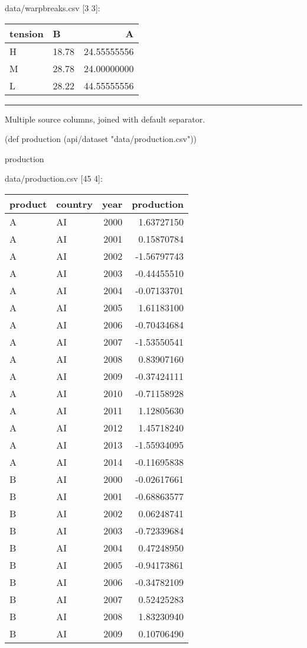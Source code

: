 \documentclass[]{article}
\newenvironment{Shaded}{\begin{snugshade}}{\end{snugshade}}
\newcommand{\StringTok}[1]{\textcolor[rgb]{0.31,0.60,0.02}{#1}}
\newcommand{\FunctionTok}[1]{\textcolor[rgb]{0.00,0.00,0.00}{#1}}
\newcommand{\BuiltInTok}[1]{#1}
\newcommand{\NormalTok}[1]{#1}
\begin{document}
data/warpbreaks.csv {[}3 3{]}:

\begin{longtable}[]{@{}llr@{}}
\toprule
tension & B & A\tabularnewline
\midrule
\endhead
H & 18.78 & 24.55555556\tabularnewline
M & 28.78 & 24.00000000\tabularnewline
L & 28.22 & 44.55555556\tabularnewline
\bottomrule
\end{longtable}

\begin{center}\rule{0.5\linewidth}{0.5pt}\end{center}

Multiple source columns, joined with default separator.

\begin{Shaded}
\begin{Highlighting}[]
\NormalTok{(}\BuiltInTok{def}\FunctionTok{ production }\NormalTok{(api/dataset }\StringTok{"data/production.csv"}\NormalTok{))}
\end{Highlighting}
\end{Shaded}

\begin{Shaded}
\begin{Highlighting}[]
\NormalTok{production}
\end{Highlighting}
\end{Shaded}

data/production.csv {[}45 4{]}:

\begin{longtable}[]{@{}llrr@{}}
\toprule
product & country & year & production\tabularnewline
\midrule
\endhead
A & AI & 2000 & 1.63727150\tabularnewline
A & AI & 2001 & 0.15870784\tabularnewline
A & AI & 2002 & -1.56797743\tabularnewline
A & AI & 2003 & -0.44455510\tabularnewline
A & AI & 2004 & -0.07133701\tabularnewline
A & AI & 2005 & 1.61183100\tabularnewline
A & AI & 2006 & -0.70434684\tabularnewline
A & AI & 2007 & -1.53550541\tabularnewline
A & AI & 2008 & 0.83907160\tabularnewline
A & AI & 2009 & -0.37424111\tabularnewline
A & AI & 2010 & -0.71158928\tabularnewline
A & AI & 2011 & 1.12805630\tabularnewline
A & AI & 2012 & 1.45718240\tabularnewline
A & AI & 2013 & -1.55934095\tabularnewline
A & AI & 2014 & -0.11695838\tabularnewline
B & AI & 2000 & -0.02617661\tabularnewline
B & AI & 2001 & -0.68863577\tabularnewline
B & AI & 2002 & 0.06248741\tabularnewline
B & AI & 2003 & -0.72339684\tabularnewline
B & AI & 2004 & 0.47248950\tabularnewline
B & AI & 2005 & -0.94173861\tabularnewline
B & AI & 2006 & -0.34782109\tabularnewline
B & AI & 2007 & 0.52425283\tabularnewline
B & AI & 2008 & 1.83230940\tabularnewline
B & AI & 2009 & 0.10706490\tabularnewline
\bottomrule
\end{longtable}
\end{document}
